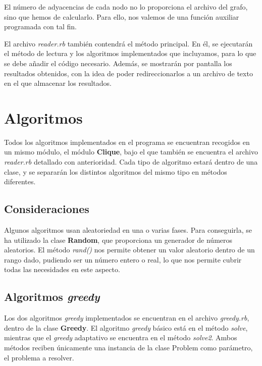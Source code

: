 El número de adyacencias de cada nodo no lo proporciona el archivo del grafo,
sino que hemos de calcularlo. Para ello, nos valemos de una función auxiliar
programada con tal fin.

El archivo \textit{reader.rb} también contendrá el método principal. En él, se
ejecutarán el método de lectura y los algoritmos implementados que incluyamos,
para lo que se debe añadir el código necesario. Además, se mostrarán por pantalla
los resultados obtenidos, con la idea de poder redireccionarlos a un archivo de
texto en el que almacenar los resultados.


\section{Algoritmos}

Todos los algoritmos implementados en el programa se encuentran recogidos en
un mismo módulo, el módulo \textbf{Clique}, bajo el que también se encuentra el
archivo \textit{reader.rb} detallado con anterioridad. Cada tipo de algoritmo
estará dentro de una clase, y se separarán los distintos algoritmos del mismo
tipo en métodos diferentes.

\subsection{Consideraciones}

Algunos algoritmos usan aleatoriedad en una o varias fases. Para conseguirla, se
ha utilizado la clase \textbf{Random}, que proporciona un generador de números
aleatorios. El método \textit{rand()} nos permite obtener un valor aleatorio
dentro de un rango dado, pudiendo ser un número entero o real, lo que nos permite
cubrir todas las necesidades en este aspecto.


\subsection{Algoritmos \textit{greedy}}

Los dos algoritmos \textit{greedy} implementados se encuentran en el archivo
\textit{greedy.rb}, dentro de la clase \textbf{Greedy}. El algoritmo \textit{greedy}
básico está en el método \textit{solve}, mientras que el \textit{greedy} adaptativo
se encuentra en el método \textit{solve2}. Ambos métodos reciben únicamente una
instancia de la clase Problem como parámetro, el problema a resolver.

